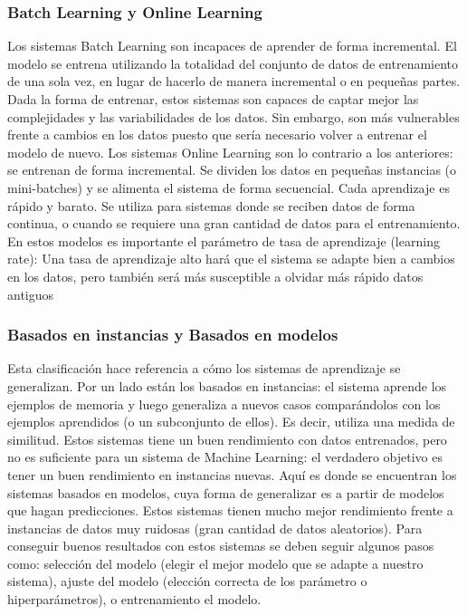 \documentclass[12pt,a4paper,Spanish]{book}
\begin{document}
\subsubsection{Batch Learning y Online Learning}
Los sistemas Batch Learning son incapaces de aprender de forma incremental. El modelo se entrena utilizando la totalidad del conjunto de datos de entrenamiento de una sola vez, en lugar de hacerlo de manera incremental o en pequeñas partes. Dada la forma de entrenar, estos sistemas son capaces de captar mejor las complejidades y las variabilidades de los datos. Sin embargo, son más vulnerables frente a cambios en los datos puesto que sería necesario volver a entrenar el modelo de nuevo.
\newline
Los sistemas Online Learning son lo contrario a los anteriores: se entrenan de forma incremental. Se dividen los datos en pequeñas instancias (o mini-batches) y se alimenta el sistema de forma secuencial. Cada aprendizaje es rápido y barato. Se utiliza para sistemas donde se reciben datos de forma continua, o cuando se requiere una gran cantidad de datos para el entrenamiento. En estos modelos es importante el parámetro de tasa de aprendizaje (learning rate): Una tasa de aprendizaje alto hará que el sistema se adapte bien a cambios en los datos, pero también será más susceptible a olvidar más rápido datos antiguos


\subsubsection{Basados en instancias y Basados en modelos}
Esta clasificación hace referencia a cómo los sistemas de aprendizaje se generalizan. Por un lado están los basados en instancias: el sistema aprende los ejemplos de memoria y luego generaliza a nuevos casos comparándolos con los ejemplos aprendidos (o un subconjunto de
ellos). Es decir, utiliza una medida de similitud. Estos sistemas tiene un buen rendimiento con datos entrenados, pero no es suficiente para un sistema de Machine Learning: el verdadero objetivo es tener un buen rendimiento en instancias nuevas.
\newline
Aquí es donde se encuentran los sistemas basados en modelos, cuya forma de generalizar es a partir de modelos que hagan predicciones. Estos sistemas tienen mucho mejor rendimiento frente a instancias de datos muy ruidosas (gran cantidad de datos aleatorios). Para conseguir buenos resultados con estos sistemas se deben seguir algunos pasos como: selección del modelo (elegir el mejor modelo que se adapte a nuestro sistema), ajuste del modelo (elección correcta de los parámetro o hiperparámetros),  o entrenamiento el modelo.
\end{document}
